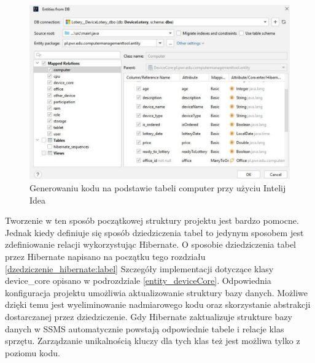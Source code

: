 \begin{figure}[h]
		\centering
    \includegraphics[width=0.7\linewidth]{rys04/generate.pdf}
    \caption{Generowaniu kodu na podstawie tabeli computer przy użyciu Intelij Idea}
    \label{generate:label}
\end{figure}

Tworzenie w ten sposób początkowej struktury projektu jest bardzo pomocne. Jednak kiedy definiuje się sposób dziedziczenia tabel to jedynym sposobem jest zdefiniowanie relacji wykorzystując Hibernate. O sposobie dziedziczenia tabel przez Hibernate napisano na początku tego rozdziału \ref{dzedziczenie_hibernate:label} Szczegóły implementacji dotyczące klasy device\_core opisano w podrozdziale \ref{entity_deviceCore}. Odpowiednia konfiguracja projektu umożliwia aktualizowanie struktury bazy danych. Możliwe dzięki temu jest wyeliminowanie nadmiarowego kodu oraz skorzystanie abstrakcji dostarczanej przez dziedziczenie. Gdy Hibernate zaktualizuje strukture bazy danych w SSMS automatycznie powstają odpowiednie tabele i relacje klas sprzętu. Zarządzanie unikalnością kluczy dla tych klas też jest możliwa tylko z poziomu kodu.
 
